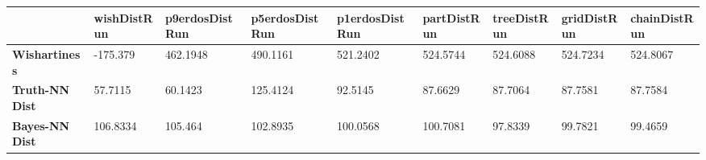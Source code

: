 \begin{tabular}{|l|l|l|l|l|l|l|l|l|}
\hline
&\textbf{wishDistRun}&\textbf{p9erdosDistRun}&\textbf{p5erdosDistRun}&\textbf{p1erdosDistRun}&\textbf{partDistRun}&\textbf{treeDistRun}&\textbf{gridDistRun}&\textbf{chainDistRun}\\\hline
\textbf{Wishartiness}&-175.379&462.1948&490.1161&521.2402&524.5744&524.6088&524.7234&524.8067\\\hline
\textbf{Truth-NN Dist}&57.7115&60.1423&125.4124&92.5145&87.6629&87.7064&87.7581&87.7584\\\hline
\textbf{Bayes-NN Dist}&106.8334&105.464&102.8935&100.0568&100.7081&97.8339&99.7821&99.4659\\\hline
\end{tabular}
